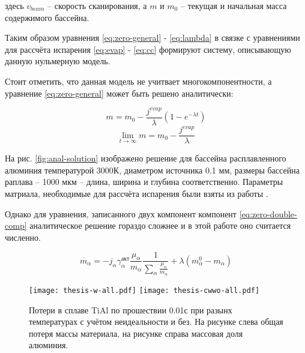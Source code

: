 \noindent
здесь $v_{beam}$ -- скорость сканирования, а $m$ и $m_0$ -- текущая и начальная масса содержимого бассейна.

Таким образом уравнения \ref{eq:zero-general} - \ref{eq:lambda} в связке с уравнениями для рассчёта испарения \ref{eq:evap} - \ref{eq:cc} формируют систему, описывающую данную нульмерную модель.

Стоит отметить, что данная модель не учитвает многокомпонентности, а уравнение \ref{eq:zero-general} может быть решено аналитически:

\begin{equation}
    m = m_0 -\frac{j^{evap}}{\lambda} (1 - e^{-\lambda t})
\end{equation}
\begin{equation}
    \lim_{t\rightarrow \infty } m = m_0 - \frac{j^{evap}}{\lambda}
\end{equation}


На рис. \ref{fig:anal-solution} изображено решение для бассейна расплавленного алюминия температурой 3000К, диаметром источника 0.1 мм, размеры бассейна раплава -- 1000 мкм -- длина, ширина и глубина соответственно. Параметры матриала, необходимые для рассчёта испарения были взяты из работы \cite{klassen2018simulation}.


Однако для уравнения, записанного двух компонент компонент  \ref{eq:zero-double-comp} аналитическое решение гораздо сложнее и в этой работе оно считается численно. 

\begin{equation}
    \label{eq:zero-double-comp}
    \dot{m_{\alpha}} = -j_{\alpha} \gamma^{\text{акт}}_{\alpha} \frac{\mu_{\alpha}}{m_{\alpha}}\frac{1}{\sum\limits_{\alpha} \frac{\mu_{\alpha}}{m_{\alpha}}} + \lambda (m_{\alpha}^0 - m_{\alpha})
\end{equation}


\begin{figure}
    \texttt{[image: thesis-w-all.pdf]}\hfill
    \texttt{[image: thesis-cwwo-all.pdf]}\hfill
    \caption{Потери в сплаве TiAl по прошествии 0.01с при разынх температурах с учётом неидеальности и без. На рисунке слева общая потеря массы материала, на рисунке справа массовая доля алюминия.}
\end{figure}

